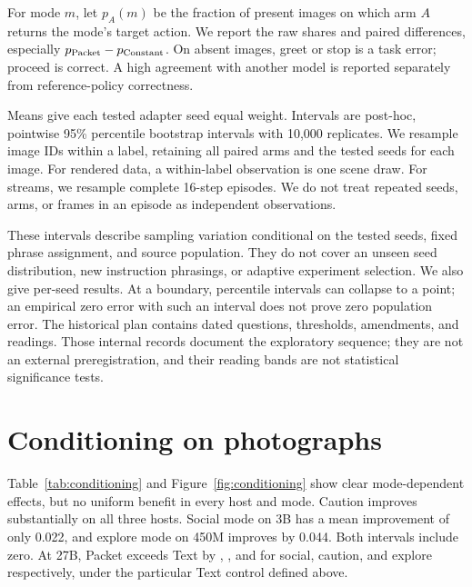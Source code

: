 \documentclass[10pt]{article}
\begin{document}
For mode $m$, let $p_A(m)$ be the fraction of present images on which
arm $A$ returns the mode's target action. We report the raw shares and
paired differences, especially $p_{\rm Packet}-p_{\rm Constant}$.
On absent images, greet or stop is a task error; proceed is correct.
A high agreement with another model is reported separately from
reference-policy correctness.

Means give each tested adapter seed equal weight. Intervals are
post-hoc, pointwise 95\% percentile bootstrap intervals with 10,000
replicates. We resample image IDs within a label, retaining all paired
arms and the tested seeds for each image. For rendered data, a
within-label observation is one scene draw. For streams, we resample
complete 16-step episodes. We do not treat repeated seeds, arms, or
frames in an episode as independent observations.

These intervals describe sampling variation conditional on the tested
seeds, fixed phrase assignment, and source population. They do not
cover an unseen seed distribution, new instruction phrasings, or
adaptive experiment selection. We also give per-seed results. At a
boundary, percentile intervals can collapse to a point; an empirical
zero error with such an interval does not prove zero population error.
The historical plan contains dated questions, thresholds, amendments,
and readings. Those internal records document the exploratory sequence;
they are not an external preregistration, and their reading bands are
not statistical significance tests.

\section{Conditioning on photographs}
Table~\ref{tab:conditioning} and Figure~\ref{fig:conditioning} show clear
mode-dependent effects, but no uniform benefit in every host and mode.
Caution improves substantially on all three hosts. Social mode on 3B
has a mean improvement of only 0.022, and explore mode on 450M improves
by 0.044. Both intervals include zero. At 27B, Packet exceeds Text
by \SocialVsText{}, \CautionVsText{}, and \ExploreVsText{} for social,
caution, and explore respectively, under the particular Text control
defined above.
\end{document}
